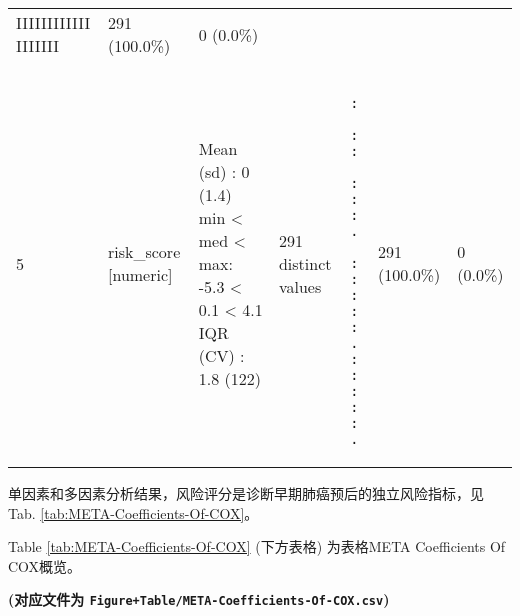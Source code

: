 \documentclass[
]{article}
\begin{document}
\begin{longtable}[]{@{}lllllll@{}}
\begin{minipage}[t]{0.15\columnwidth}
IIIIIIIIIIII
IIIIIII\strut
\end{minipage} & \begin{minipage}[t]{0.08\columnwidth}\raggedright
291
(100.0\%)\strut
\end{minipage} & \begin{minipage}[t]{0.08\columnwidth}\raggedright
0
(0.0\%)\strut
\end{minipage}\tabularnewline
\begin{minipage}[t]{0.03\columnwidth}\raggedright
5\strut
\end{minipage} & \begin{minipage}[t]{0.16\columnwidth}\raggedright
risk\_score
{[}numeric{]}\strut
\end{minipage} & \begin{minipage}[t]{0.16\columnwidth}\raggedright
Mean (sd) : 0 (1.4)
min \textless{} med \textless{} max:
-5.3 \textless{} 0.1 \textless{} 4.1
IQR (CV) : 1.8 (122)\strut
\end{minipage} & \begin{minipage}[t]{0.15\columnwidth}\raggedright
291 distinct values\strut
\end{minipage} & \begin{minipage}[t]{0.15\columnwidth}\raggedright
\begin{verbatim}
      :
      : :
    : : : .
  : : : : :
. : : : : : .
\end{verbatim}
\strut
\end{minipage} & \begin{minipage}[t]{0.08\columnwidth}\raggedright
291
(100.0\%)\strut
\end{minipage} & \begin{minipage}[t]{0.08\columnwidth}\raggedright
0
(0.0\%)\strut
\end{minipage}\tabularnewline
\bottomrule
\end{longtable}

单因素和多因素分析结果，风险评分是诊断早期肺癌预后的独立风险指标，见 Tab. \ref{tab:META-Coefficients-Of-COX}。

\begin{center}\vspace{1.5cm}\end{center}

Table \ref{tab:META-Coefficients-Of-COX} (下方表格) 为表格META Coefficients Of COX概览。

\textbf{(对应文件为 \texttt{Figure+Table/META-Coefficients-Of-COX.csv})}
\end{document}

